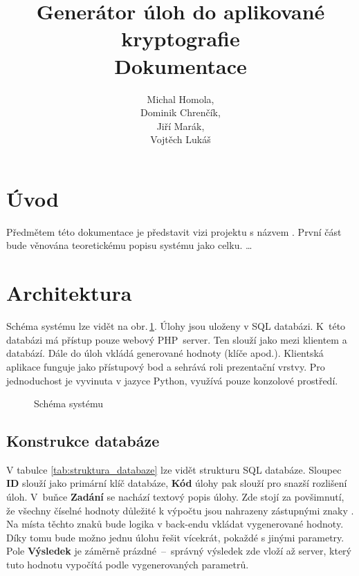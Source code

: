 \documentclass[titlepage]{article}
\title{Generátor úloh do aplikované kryptografie\\Dokumentace}
\author{Michal Homola,\\Dominik Chrenčík,\\Jiří Marák,\\Vojtěch Lukáš}
\begin{document}
\maketitle

\tableofcontents

\section*{Úvod}
Předmětem této dokumentace je představit vizi projektu s názvem . První část bude věnována teoretickému popisu systému jako celku. \dots

\section{Architektura}
Schéma systému lze vidět na obr.\,\ref{fig:sys}. Úlohy jsou uloženy v SQL databázi. K~této databázi má přístup pouze webový PHP~server. Ten slouží jako  mezi klientem a databází. Dále do úloh vkládá generované hodnoty (klíče apod.).
Klientská aplikace funguje jako přístupový bod a sehrává roli prezentační vrstvy. Pro jednoduchost je vyvinuta v jazyce Python, využívá pouze konzolové pro\-středí. 
\begin{figure}[h!]
    \centering
        
    \caption{Schéma systému}
    \label{fig:sys}
\end{figure}

\subsection{Konstrukce databáze}
V tabulce \ref{tab:struktura_databaze} lze vidět strukturu SQL databáze. 
Sloupec \textbf{ID} slouží jako primární klíč databáze, \textbf{Kód} úlohy pak slouží pro snazší rozlišení úloh. V~buňce \textbf{Zadání} se nachází textový popis úlohy. Zde stojí za povšimnutí, že všechny číselné hodnoty důležité k výpočtu jsou nahrazeny zástupnými znaky . 
Na místa těchto znaků bude logika v back-endu vkládat vygenerované hodnoty. Díky tomu bude možno jednu úlohu řešit vícekrát, po\-kaž\-dé s jinými parametry. 
Pole \textbf{Výsledek} je záměrně prázdné~--~správný výsledek zde vloží až server, který tuto hodnotu vypočítá podle vygenerovaných parametrů. 
\end{document}
